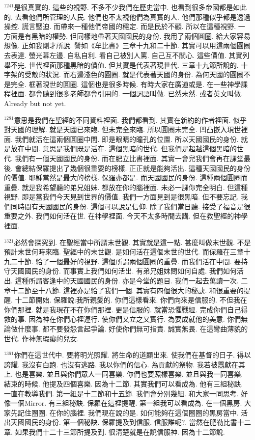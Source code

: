 \documentclass{book}
\begin{document}
$^{1241}$是很真實的.
這些的視野.
不多不少我們在歷史當中.
也看到很多帝國都是如此的.
去看他們所管理的人民.
他們也不太視他們為真實的人.
他們那種似乎都是透過操控.
謊言壓迫.
而帶來一種他們帝國的穩定.
而是民於不顧.
所以在這種視野.
一方面是有黑暗的權勢.
但同樣地帶著天國國民的身份.
我用了兩個圓圈.
給大家容易想像.
正如我剛才所說.
譬如《牟比書》三章十九和二十節.
其實可以用這兩個圓圈去表達.
螢光幕左邊.
自私自利.
看自己被別人罵.
自己互不關心.
這些價值.
其實列舉不完.
世代裡面那種黑暗的價值.
但其實是代表著現世代.
三章十九節所說的.
十字架的受敵的狀況.
而右邊淺色的圓圈.
就是代表著天國的身份.
為何天國的圓圈不是完全.
框著現世的圓圈.
這個也是很多時候.
有時大家在廣道或是.
在一些神學課程裡面.
都會聽到很多老師都會引用的.
一個詞語叫做.
已然未然.
或者英文叫做.
Already but not yet.

$^{1281}$意思是我們在聖經的不同資料裡面.
我們都看到.
其實在新約的作者裡面.
似乎對天國的理解.
就是天國已來臨.
但未完全來臨.
所以圓圈未完全.
凹凸嵌入現世裡面.
我們就活在這兩個圓圈中間.
即是眼睛的瞳孔的位置.
所以天國國民的身份.
就是放在中間.
意思是我們既是活在.
這個黑暗的世代.
但我們是超越這個黑暗的世代.
我們有一個天國國民的身份.
而在肥立比書裡面.
其實一會兒我們會再在課堂最後.
會總結保羅提出了幾個很重要的榜樣.
正正就是能夠活出.
這種天國國民的身份的價值.
耶穌當然是最大的榜樣.
保羅亦都是.
而天國國民的身份.
這種兩個圓圈而重疊.
就是我希望聽的弟兄姐妹.
都放在你的腦裡面.
未必一課你完全明白.
但這種視野.
即是當我們今天見到世界的價值.
我們一方面見到是很黑暗.
但不要忘記.
我們同時間有天國國民的身份.
這個可以說是信仰.
除了我們當日聽.
接受了福音是很重要之外.
我們如何活在世.
在神學裡面.
今天不太多時間去講.
但在教聖經的神學裡面.

$^{1321}$必然會探究到.
在聖經當中所謂末世觀.
其實就是這一點.
甚麼叫做末世觀.
不是預計末世何時來臨.
聖經中的末世觀.
是如何活在這個末世的世代.
而保羅在三章十九二十節.
給了一個最好的視野.
這個所謂兩個圓圈的重疊.
而我們活在中間.
要持守天國國民的身份.
而事實上我們如何活出.
有弟兄姐妹問如何自處.
我們如何活出.
這種所謂客逢中的天國國民的身份.
亦是今堂的題目.
我們一起去萬讀一次.
二章十二節至十八節.
這裡亦是給了我們一個.
其實有四個很大的秘訣.
和很重要的提醒.
十二節開始.
保羅說:我所親愛的.
你們這樣看來.
你們向來是信服的.
不但我在你們那裡.
就是我現在不在你們那裡.
更是信服的.
就當恐懼戰經.
完成你們自己得救的事.
因為神在你們心裡運行.
使你們又立之又實行.
為要成就他的美意.
你們無論做什麼事.
都不要發怨言起爭論.
好使你們無可指責.
誠實無畏.
在這彎曲薄貌的世代.
作神無瑕癡的兒女.

$^{1361}$你們在這世代中.
要將明光照耀.
將生命的道顯出來.
使我們在基督的日子.
得以誇耀.
我沒有白跑.
也沒有逃路.
我以你們的信心.
為貢獻的祭物.
我若被囂獻在其上.
也是喜樂.
並且與你們眾人一同喜樂.
你們也要照樣喜樂.
並且與我一同喜樂.
結束的時候.
他提及四個喜樂.
因為十二節.
其實我們可以看成為.
他有三組秘訣.
一直在教導我們.
第一組是十二節和十五節.
我們會分別幾組.
和大家一同思考.
好像一個Mirror.
有三組秘訣.
保羅在這裡提醒.
第一組我可以看成為.
在一個黑房.
大家先記住圈圈.
在你的腦裡.
我們現在說的是.
如何能夠在這個圈圈的黑房當中.
活出天國國民的身份.
第一個秘訣.
保羅提及到信服.
信服誰呢?.
當然在肥勒比書十二章.
如果我們十二十三節所提及到.
很清楚就是在說信服神.
因為十二節說.
\end{document}

